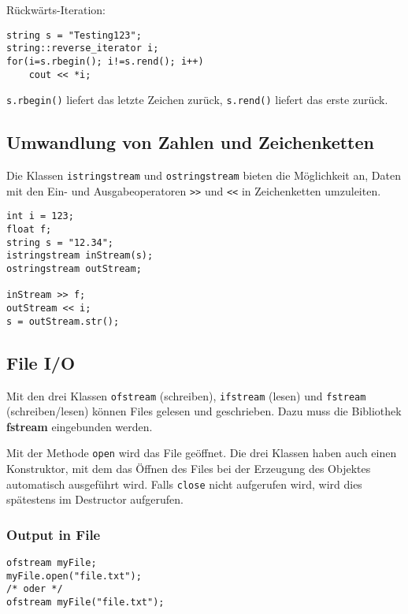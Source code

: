 \documentclass{article}
\newenvironment{code}
	{\begin{shaded}\vspace{-2.2mm}} 
	{\vspace{-5.0mm}\end{shaded}}
\begin{document}
\begin{multicols*}{3}
			Rückwärts-Iteration:
			\begin{code}
				\begin{lstlisting}[style=list]
string s = "Testing123";
string::reverse_iterator i;
for(i=s.rbegin(); i!=s.rend(); i++)
	cout << *i;
				\end{lstlisting}
			\end{code}
			
			\lstinline!s.rbegin()! liefert das letzte Zeichen zurück, \lstinline!s.rend()! liefert das erste zurück.
		
		\subsection{Umwandlung von Zahlen und Zeichenketten} %
			Die Klassen \lstinline!istringstream! und \lstinline!ostringstream! bieten die Möglichkeit an, Daten mit den Ein- und Ausgabeoperatoren \lstinline!>>! und \lstinline!<<! in Zeichenketten umzuleiten.
			
			\begin{code}
				\begin{lstlisting}[style=list]
int i = 123;
float f;
string s = "12.34";
istringstream inStream(s);
ostringstream outStream;

inStream >> f;
outStream << i;
s = outStream.str();
				\end{lstlisting}
			\end{code}
		
		\subsection{File I/O} %
			Mit den drei Klassen \lstinline!ofstream! (schreiben), \lstinline!ifstream! (lesen) und \lstinline!fstream! (schreiben/lesen) können Files gelesen und geschrieben. Dazu muss die Bibliothek \textbf{fstream} eingebunden werden.
			
			Mit der Methode \lstinline!open! wird das File geöffnet. Die drei Klassen haben auch einen Konstruktor, mit dem das Öffnen des Files bei der Erzeugung des Objektes automatisch ausgeführt wird. Falls \lstinline!close! nicht aufgerufen wird, wird dies spätestens im Destructor aufgerufen.
			
			\subsubsection{Output in File} %
				\begin{code}
					\begin{lstlisting}[style=list]
ofstream myFile;
myFile.open("file.txt");
/* oder */
ofstream myFile("file.txt");


\end{lstlisting}
\end{code}
\end{multicols*}
\end{document}
